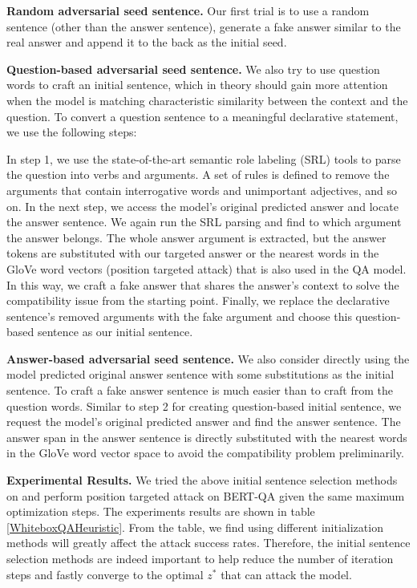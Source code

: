 \textbf{Random adversarial seed sentence.}
Our first trial is to use a random sentence (other than the answer sentence), generate a fake answer similar to the real answer and append it to the back as the initial seed.

\textbf{Question-based adversarial seed sentence.}
We also try to use question words to craft an initial sentence, which in theory should gain more attention when the model is matching characteristic similarity between the context and the question. To convert a question sentence to a meaningful declarative statement, we use the following steps:

In step 1, we use the state-of-the-art semantic role labeling (SRL) tools \citep{He2017DeepSR} to parse the question into verbs and arguments. A set of rules is defined to remove the arguments that contain interrogative words and unimportant adjectives, and so on. In the next step, we access the model's original predicted answer and locate the answer sentence. We again run the SRL parsing and find to which argument the answer belongs. The whole answer argument is extracted, but the answer tokens are substituted with our targeted answer or the nearest words in the GloVe word vectors \citep{Pennington2014GloveGV} (position targeted attack) that is also used in the QA model. In this way, we craft a fake answer that shares the answer's context to solve the compatibility issue from the starting point. Finally, we replace the declarative sentence's removed arguments with the fake argument and choose this question-based sentence as our initial sentence.

\textbf{Answer-based adversarial seed  sentence.}
We also consider directly using the model predicted original answer sentence with some substitutions as the initial sentence. To craft a fake answer sentence is much easier than to craft from the question words. Similar to step 2 for creating
question-based initial sentence, we request the model's original predicted answer and find the answer sentence. The answer span in the answer sentence is directly substituted with the nearest words in the GloVe word vector space to avoid the compatibility problem preliminarily.

\textbf{Experimental Results.} We tried the above initial sentence selection methods on \advcodecword and perform position targeted attack on BERT-QA given the same maximum optimization steps. The experiments results are shown in table \ref{WhiteboxQAHeuristic}. From the table, we find using different initialization methods will greatly affect the attack success rates. Therefore, the initial sentence selection methods are indeed important to help reduce the number of iteration steps and fastly converge to the optimal $z^*$ that can attack the model.

